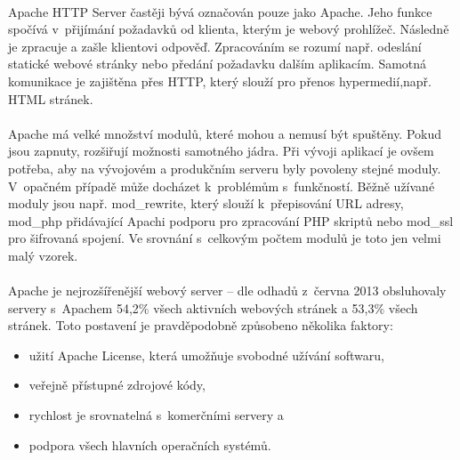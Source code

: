 \documentclass[11pt,a4paper,titlepage,oneside]{book}
\begin{document}

		\paragraph{} Apache HTTP Server častěji bývá označován pouze jako Apache. Jeho funkce spočívá v~přijímání požadavků od klienta, kterým je webový prohlížeč. Následně je zpracuje a zašle klientovi odpověď. Zpracováním se rozumí např. odeslání statické webové stránky nebo předání požadavku dalším aplikacím. Samotná komunikace je zajištěna přes \ac{HTTP}, který slouží pro přenos hypermedií\cite{rfc2616},např. \ac{HTML} stránek.
		\paragraph{}Apache má velké množství modulů, které mohou a nemusí být spuštěny. Pokud jsou zapnuty, rozšiřují možnosti samotného jádra. Při vývoji aplikací je ovšem potřeba, aby na vývojovém a produkčním serveru byly povoleny stejné moduly. V~opačném případě může docházet k~problémům s~funkčností. Běžně užívané moduly jsou např. mod\_rewrite, který slouží k~přepisování URL adresy, mod\_php přidávající Apachi podporu pro zpracování PHP skriptů nebo mod\_ssl pro šifrovaná spojení. Ve srovnání s~celkovým počtem modulů je toto jen velmi malý vzorek.


		\paragraph{}\label{sec:marketShare} Apache je nejrozšířenější webový server -- dle odhadů\cite{netcraft_survey} z~června 2013 obsluhovaly servery s~Apachem 54,2\% všech aktivních webových stránek a 53,3\% všech stránek. Toto postavení je pravděpodobně způsobeno několika faktory:
		\begin{itemize}
			\item užití Apache License, která umožňuje svobodné užívání softwaru,
			\item veřejně přístupné zdrojové kódy,
			\item rychlost je srovnatelná s~komerčními servery a 
			\item podpora všech hlavních operačních systémů.
		\end{itemize}
		
\end{document}
